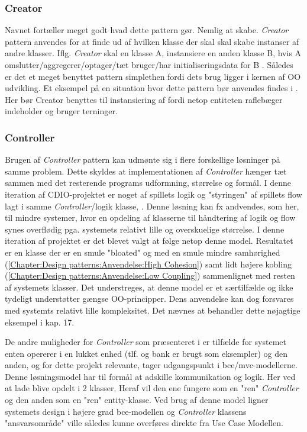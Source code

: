\subsubsection{Creator}\label{Chapter:Design patterns:Anvendelse:Creator}
Navnet fortæller meget godt hvad dette pattern gør. Nemlig at skabe. \textit{Creator} pattern anvendes for at finde ud af hvilken klasse der skal skal skabe instanser af andre klasser. Iflg. \textit{Creator} skal en klasse A, instansiere en anden klasse B, hvis A omslutter/aggregerer/optager/tæt bruger/har initialiseringsdata for B \cite{umlbook}. Således er det et meget benyttet pattern simplethen fordi dets brug ligger i kernen af OO udvikling. Et eksempel på en situation hvor dette pattern bør anvendes findes i . Her bør Creator benyttes til instansiering af  fordi netop entiteten raflebæger indeholder og bruger terninger. 

\subsubsection{Controller}\label{Chapter:Design patterns:Anvendelse:Controller}
Brugen af \textit{Controller} pattern kan udmønte sig i flere forskellige løsninger på samme problem. Dette skyldes at implementationen af \textit{Controller} hænger tæt sammen med det resterende programs udformning, størrelse og formål. I denne iteration af CDIO-projektet er noget af spillets logik og "styringen" af spillets flow lagt i samme \textit{Controller}/logik klasse, . Denne løsning kan fx andvendes, som her, til mindre systemer, hvor en opdeling af klasserne til håndtering af logik og flow synes overflødig pga. systemets relativt lille og overskuelige størrelse. I denne iteration af projektet er det blevet valgt at følge netop denne model. Resultatet er en klasse  der er en smule "bloated" og med en smule mindre samhørighed (\vref{Chapter:Design patterns:Anvendelse:High Cohesion}) samt lidt højere kobling (\vref{Chapter:Design patterns:Anvendelse:Low Coupling}) sammenlignet med resten af systemets klasser. Det understreges, at denne model er et særtilfælde og ikke tydeligt understøtter gængse OO-principper. Dens anvendelse kan dog forsvares med systemts relativt lille kompleksitet. Det nævnes at \cite{umlbook} behandler dette nøjagtige eksempel i kap. 17.

De andre muligheder for \textit{Controller} som præsenteret i \cite{umlbook} er tilfælde for systemet enten opererer i en lukket enhed (tlf. og bank er brugt som eksempler) og den anden, og for dette projekt relevante, tager udgangspunkt i bce/mvc-modellerne. Denne løsningsmodel har til formål at adskille kommunikation og logik. Her ved at lade  blive opdelt i 2 klasser. Heraf vil den ene fungere som en "ren" \textit{Controller} og den anden som en "ren" entity-klasse. Ved brug af denne model ligner systemets design i højere grad bce-modellen og \textit{Controller} klassens "ansvarsområde"  ville således kunne overføres direkte fra Use Case Modellen.        




